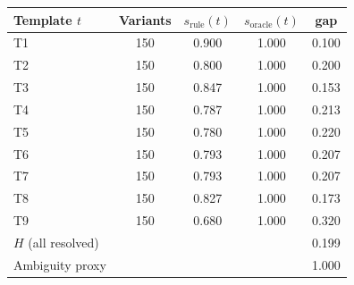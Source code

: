 \begin{tabular}{lcccc}
\toprule
Template $t$ & Variants & $s_{\mathrm{rule}}(t)$ & $s_{\mathrm{oracle}}(t)$ & gap \\
\midrule
T1 & 150 & 0.900 & 1.000 & 0.100 \\
T2 & 150 & 0.800 & 1.000 & 0.200 \\
T3 & 150 & 0.847 & 1.000 & 0.153 \\
T4 & 150 & 0.787 & 1.000 & 0.213 \\
T5 & 150 & 0.780 & 1.000 & 0.220 \\
T6 & 150 & 0.793 & 1.000 & 0.207 \\
T7 & 150 & 0.793 & 1.000 & 0.207 \\
T8 & 150 & 0.827 & 1.000 & 0.173 \\
T9 & 150 & 0.680 & 1.000 & 0.320 \\
\midrule
$H$ (all resolved) & & & & 0.199 \\
Ambiguity proxy & & & & 1.000 \\
\bottomrule
\end{tabular}
